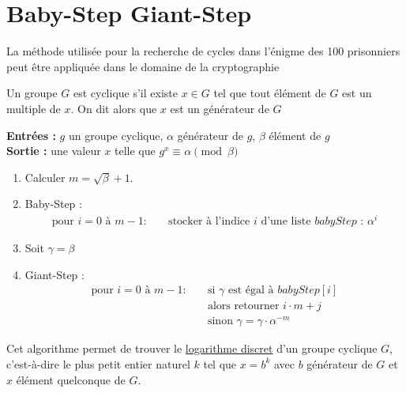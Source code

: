 \section{Baby-Step Giant-Step}

La méthode utilisée pour la recherche de cycles dans l'énigme des 100 prisonniers peut
être appliquée dans le domaine de la cryptographie

\begin{tcolorbox}
    Un groupe $G$ est cyclique s'il existe $x \in G$ 
    tel que tout élément de $G$ est un multiple de $x$.
    On dit alors que $x$ est un générateur de $G$ 
\end{tcolorbox}

\begin{tcolorbox}[title=Algorithme \href{https://fr.wikipedia.org/wiki/Baby-step_giant-step}{Baby-Step Giant-Step}]
    \textbf{Entrées :} $g$ un groupe cyclique, $\alpha$ générateur de $g$, $\beta$ élément de $g$ \\
    \textbf{Sortie :} une valeur $x$ telle que $g^x \equiv \alpha \pmod{\beta}$

    \begin{enumerate}
        \item  Calculer $m = \sqrt{\beta} +1$.
        \item Baby-Step :
              \[
                \begin{aligned}
                    \text{pour } i = 0 \text{ à } m-1: \quad & \text{stocker à l'indice $i$ d'une liste $babyStep$ : } \alpha^i
                \end{aligned}
              \]
        \item Soit $\gamma = \beta$
        \item Giant-Step :
              \[
                \begin{aligned}
                    \text{pour } i = 0 \text{ à } m-1: \quad & \text{si } \gamma \text{ est égal à } babyStep[i] \\
                                                             & \text{alors retourner } i \cdot m + j \\
                                                             & \text{sinon } \gamma = \gamma \cdot \alpha^{-m}
                \end{aligned}
              \]
    \end{enumerate}

\end{tcolorbox}

Cet algorithme permet de trouver le \href{https://fr.wikipedia.org/wiki/Logarithme_discret}{logarithme discret} d'un groupe cyclique $G$,
c'est-à-dire le plus petit entier naturel $k$ tel que $x = b^k$ avec $b$ générateur de $G$
et $x$ élément quelconque de $G$.

